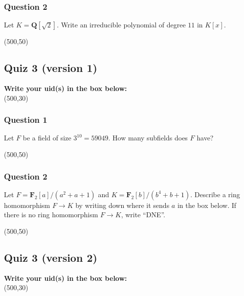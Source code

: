 \documentclass[11pt]{article}
\begin{document}
\subsubsection{Question 2}
\label{sec:org620e7b1}

Let \(K = \mathbf{Q}[\sqrt 2]\).
Write an irreducible polynomial of degree \(11\) in \(K[x]\).

\noindent
\framebox(500,50)

\vspace{1cm}
\subsection{Quiz 3 (version 1)}
\label{sec:org9848b71}
\vspace{1cm}

\noindent
\textbf{Write your uid(s) in the box below:}\\
\framebox(500,30)

\vspace{1cm}
\subsubsection{Question 1}
\label{sec:org4678b00}

Let \(F\) be a field of size \(3^{10} = 59049\).
How many subfields does \(F\) have?

\noindent
\framebox(500,50)

\vspace{1cm}
\subsubsection{Question 2}
\label{sec:orgd683f77}
Let \(F = \mathbf{F}_2[a]/(a^2+a+1)\) and \(K = \mathbf{F}_2[b]/(b^4+b+1)\).
Describe a ring homomorphism \(F \to K\) by writing down where it sends \(a\) in the box below.
If there is no ring homomorphism \(F \to K\), write ``DNE''.

\noindent
\framebox(500,50)

\vspace{3cm}
\subsection{Quiz 3 (version 2)}
\label{sec:org977ba89}
\vspace{1cm}

\noindent
\textbf{Write your uid(s) in the box below:}\\
\framebox(500,30)

\vspace{1cm}
\end{document}
